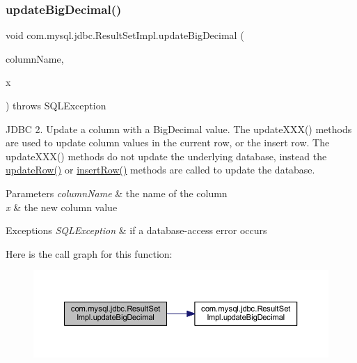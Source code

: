 \subsubsection{\texorpdfstring{update\+Big\+Decimal()}{updateBigDecimal()}\hspace{0.1cm}{\footnotesize\ttfamily [2/2]}}
{\footnotesize\ttfamily void com.\+mysql.\+jdbc.\+Result\+Set\+Impl.\+update\+Big\+Decimal (\begin{DoxyParamCaption}\item[{String}]{column\+Name,  }\item[{Big\+Decimal}]{x }\end{DoxyParamCaption}) throws S\+Q\+L\+Exception}

J\+D\+BC 2. Update a column with a Big\+Decimal value. The update\+X\+X\+X() methods are used to update column values in the current row, or the insert row. The update\+X\+X\+X() methods do not update the underlying database, instead the \mbox{\hyperlink{classcom_1_1mysql_1_1jdbc_1_1_result_set_impl_a2842d32292d023aaeeafedeed3322981}{update\+Row()}} or \mbox{\hyperlink{classcom_1_1mysql_1_1jdbc_1_1_result_set_impl_a78e304e3279cbcf60392f18c1385e3bf}{insert\+Row()}} methods are called to update the database.


\begin{DoxyParams}{Parameters}
{\em column\+Name} & the name of the column \\
\hline
{\em x} & the new column value\\
\hline
\end{DoxyParams}

\begin{DoxyExceptions}{Exceptions}
{\em S\+Q\+L\+Exception} & if a database-\/access error occurs \\
\hline
\end{DoxyExceptions}
Here is the call graph for this function\+:
\nopagebreak
\begin{figure}[H]
\begin{center}
\leavevmode
\includegraphics[width=350pt]{classcom_1_1mysql_1_1jdbc_1_1_result_set_impl_aa70d9b9fa31249d079cd0c75eab4eacf_cgraph}
\end{center}
\end{figure}
\mbox{\label{classcom_1_1mysql_1_1jdbc_1_1_result_set_impl_a89ab2f792bec03ec7dc3bbb925aa1239}} 
